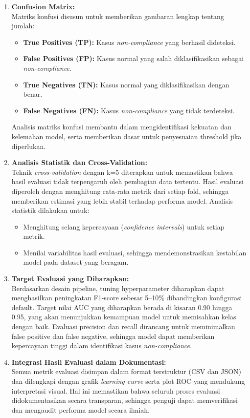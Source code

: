 \begin{enumerate}
    \item \textbf{Confusion Matrix:} \\
    Matriks konfusi disusun untuk memberikan gambaran lengkap tentang jumlah:
    \begin{itemize}
        \item \textbf{True Positives (TP):} Kasus \textit{non-compliance} yang berhasil dideteksi.
        \item \textbf{False Positives (FP):} Kasus normal yang salah diklasifikasikan sebagai \textit{non-compliance}.
        \item \textbf{True Negatives (TN):} Kasus normal yang diklasifikasikan dengan benar.
        \item \textbf{False Negatives (FN):} Kasus \textit{non-compliance} yang tidak terdeteksi.
    \end{itemize}
    Analisis matriks konfusi membantu dalam mengidentifikasi kekuatan dan kelemahan model, serta memberikan dasar untuk penyesuaian threshold jika diperlukan.

    \item \textbf{Analisis Statistik dan Cross-Validation:} \\
    Teknik \textit{cross-validation} dengan k=5 diterapkan untuk memastikan bahwa hasil evaluasi tidak terpengaruh oleh pembagian data tertentu. Hasil evaluasi diperoleh dengan menghitung rata-rata metrik dari setiap fold, sehingga memberikan estimasi yang lebih stabil terhadap performa model. Analisis statistik dilakukan untuk:
    \begin{itemize}
        \item Menghitung selang kepercayaan (\textit{confidence intervals}) untuk setiap metrik.
        \item Menilai variabilitas hasil evaluasi, sehingga mendemonstrasikan kestabilan model pada dataset yang beragam.
    \end{itemize}

    \item \textbf{Target Evaluasi yang Diharapkan:} \\
    Berdasarkan desain pipeline, tuning hyperparameter diharapkan dapat menghasilkan peningkatan F1-score sebesar 5–10\% dibandingkan konfigurasi default. Target nilai AUC yang diharapkan berada di kisaran 0.90 hingga 0.95, yang akan menunjukkan kemampuan model untuk memisahkan kelas dengan baik. Evaluasi precision dan recall dirancang untuk meminimalkan false positive dan false negative, sehingga model dapat memberikan kepercayaan tinggi dalam identifikasi kasus \textit{non-compliance}.

    \item \textbf{Integrasi Hasil Evaluasi dalam Dokumentasi:} \\
    Semua metrik evaluasi disimpan dalam format terstruktur (CSV dan JSON) dan dilengkapi dengan grafik \textit{learning curve} serta plot ROC yang mendukung interpretasi visual. Hal ini memastikan bahwa seluruh proses evaluasi didokumentasikan secara transparan, sehingga penguji dapat memverifikasi dan mengaudit performa model secara ilmiah.
\end{enumerate}


